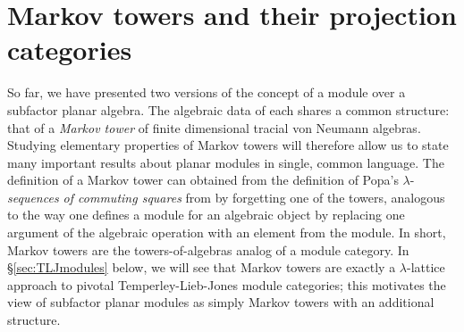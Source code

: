 \documentclass[11pt]{article}
\theoremstyle{plain}
\theoremstyle{definition}
\begin{document}
\section{Markov towers and their projection categories} 
\label{sec:MarkovTowers}

So far, we have presented two versions of the concept of a module over a subfactor planar algebra. The algebraic data of each shares a common structure: that of a \emph{Markov tower} of finite dimensional tracial von Neumann algebras. Studying elementary properties of Markov towers will therefore allow us to state many important results about planar modules in single, common language.  
The definition of a Markov tower can obtained from the definition of Popa's $\lambda$-\emph{sequences of commuting squares} from \cite{MR1334479} by forgetting one of the towers, 
analogous to the way one defines a module for an algebraic object by replacing one argument of the algebraic operation with an element from the module. In short, Markov towers are the towers-of-algebras analog of a module category. 
In \S\ref{sec:TLJmodules} below, we will see that Markov towers are exactly a $\lambda$-lattice approach to pivotal Temperley-Lieb-Jones module categories; this motivates the view of subfactor planar modules as simply Markov towers with an additional structure. 

\end{document}
